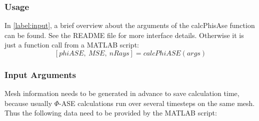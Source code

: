 \subsubsection{Usage}
In \ref{label:input}, a brief overview about the
arguments of the calcPhisAse function can be found. See the README file for 
more interface details. Otherwise it is just a function call from
a MATLAB script:
\[[phiASE,~MSE,~nRays] = calcPhiASE(args)\]

\subsubsection{Input Arguments}
Mesh information needs to be generated in advance
to save calculation time, because usually $\Phi$-ASE calculations
run over several timesteps on the same mesh. Thus the following
data need to be provided by the MATLAB script:
